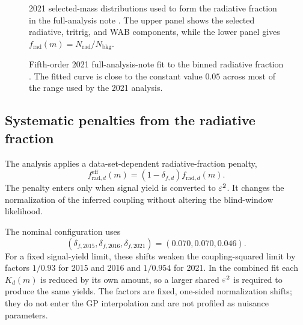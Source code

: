 \begin{figure}[H]
\centering
{}
\caption{2021 selected-mass distributions used to form the radiative fraction in the
full-analysis note \cite{HPS2021FullAnalysisNote}. The upper panel shows the selected
radiative, tritrig, and WAB components, while the lower panel gives
$f_{\mathrm{rad}}(m)=N_{\mathrm{rad}}/N_{\mathrm{bkg}}$.}
\label{fig:2021-radfrac-note-components}
\end{figure}

\begin{figure}[H]
\centering
{}
\caption{Fifth-order 2021 full-analysis-note fit to the binned radiative fraction
\cite{HPS2021FullAnalysisNote}. The fitted curve is close to the constant value
$0.05$ across most of the range used by the 2021 analysis.}
\label{fig:2021-radfrac-note-fit}
\end{figure}

\subsection{Systematic penalties from the radiative fraction}
\label{sec:radfrac-penalty}

The analysis applies a data-set-dependent radiative-fraction penalty,
\begin{equation}
f_{\mathrm{rad},d}^{\mathrm{eff}}(m)
= \left(1-\delta_{f,d}\right) f_{\mathrm{rad},d}(m).
\label{eq:frad-penalty}
\end{equation}
The penalty enters only when signal yield is converted to $\varepsilon^2$. It changes the
normalization of the inferred coupling without altering the blind-window likelihood.

The nominal configuration uses
\begin{equation}
(\delta_{f,2015},\delta_{f,2016},\delta_{f,2021})=(0.070,0.070,0.046).
\label{eq:frad-penalty-vector}
\end{equation}
For a fixed signal-yield limit, these shifts weaken the coupling-squared limit by
factors $1/0.93$ for 2015 and 2016 and $1/0.954$ for 2021. In the combined fit each
$K_d(m)$ is reduced by its own amount, so a larger shared $\varepsilon^2$ is required to
produce the same yields. The factors are fixed, one-sided normalization shifts; they
do not enter the GP interpolation and are not profiled as nuisance parameters.

